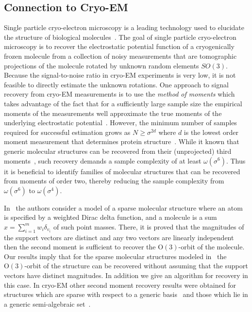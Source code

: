 \documentclass{article}
\theoremstyle{definition}
\renewcommand{\|}{|}
\renewcommand{\O}{\mathrm{O}}
\begin{document}
\subsection{Connection to Cryo-EM} 
Single particle cryo-electron microscopy is a leading technology used
to elucidate the structure of biological molecules~\cite{doerr2022emerging, toader2023frontier}. The goal of single particle cryo-electron microscopy is to recover the electrostatic potential function of a cryogenically frozen molecule from 
a collection of noisy measurements that are tomographic projections of the molecule rotated by unknown random elements
$SO(3)$. Because the signal-to-noise ratio in cryo-EM experiments is very low, it is not feasible to directly estimate the unknown rotations. One approach to signal recovery from cryo-EM measurements is
to use the \textit{method of moments} which takes advantage of the fact
that for a sufficiently large sample size the empirical moments of the measurements well approximate the true moments of the underlying electrostatic potential~\cite{bendory2020single, kam1980reconstruction, abas2022generalized}. 
However, the minimum number of samples required for successful estimation grows as $N\geq \sigma^{2d}$ where $d$ is the lowest order moment measurement that determines protein structure~\cite{bandeira2017optimal, perry2019sample}. 
While it known that generic molecular structures can be recovered from their (unprojected) third moments~\cite{bandeira2023estimation, bendory2025orbit}, such recovery demands a sample complexity of at least $\omega(\sigma^6)$. Thus it is beneficial to identify families of molecular structures that can be recovered from moments of order two, thereby reducing the sample complexity from $\omega(\sigma^6)$ to $\omega(\sigma^4)$.

In~\cite{bendory2023autocorrelation} the authors consider a model of a sparse molecular structure 
where an atom is specified by a weighted Dirac
delta function, and a molecule is a sum $x = \sum_{i = 1}^m w_i \delta_{v_i}$ of such point masses. 
There, it is proved that the magnitudes of the support vectors are distinct and any two vectors are linearly independent then 
the second moment is sufficient to recover the $\O(3)$-orbit of the molecule. 
Our results imply that for the sparse molecular structures modeled in~\cite{bendory2023autocorrelation}
the $\O(3)$-orbit of the structure can be recovered without assuming that the support vectors have distinct magnitudes.
In addition we give an algorithm for recovery in this case. 
In cryo-EM other second moment recovery results were obtained for structures which are sparse with respect to a generic basis~\cite{bendory2024sample} and those which lie in a generic semi-algebraic set~\cite{bendory2025transversality}.
\end{document}
